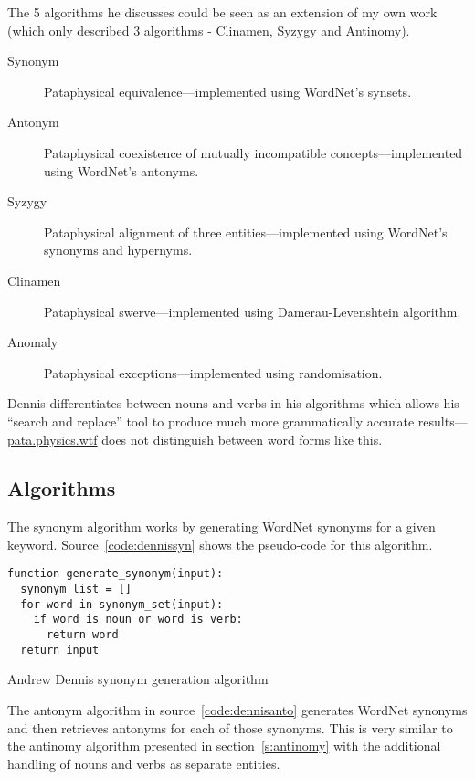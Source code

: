 The 5 algorithms he discusses could be seen as an extension of my own work (which only described 3 algorithms - Clinamen, Syzygy and Antinomy). 

\begin{description}
  \item[Synonym] Pataphysical equivalence---implemented using WordNet's synsets.
  \item[Antonym] Pataphysical coexistence of mutually incompatible concepts---implemented using WordNet's antonyms.
  \item[Syzygy] Pataphysical alignment of three entities---implemented using WordNet's synonyms and hypernyms.
  \item[Clinamen] Pataphysical swerve---implemented using Damerau-Levenshtein algorithm.
  \item[Anomaly] Pataphysical exceptions---implemented using randomisation.
\end{description}

Dennis differentiates between nouns and verbs in his algorithms which allows his ``search and replace'' tool to produce much more grammatically accurate results---\url{pata.physics.wtf} does not distinguish between word forms like this.


\subsection{Algorithms}

The synonym algorithm works by generating WordNet synonyms for a given keyword. Source~\ref{code:dennissyn} shows the pseudo-code for this algorithm.

\begin{listing}[!htbp] %
  \begin{verbatim}
function generate_synonym(input):
  synonym_list = []
  for word in synonym_set(input):
    if word is noun or word is verb:
      return word
  return input
  \end{verbatim}
\caption[Dennis synonym generation]{Andrew Dennis synonym generation algorithm}
\label{code:dennissyn}
\end{listing}

The antonym algorithm in source~\ref{code:dennisanto} generates WordNet synonyms and then retrieves antonyms for each of those synonyms. This is very similar to the antinomy algorithm presented in section~\ref{s:antinomy} with the additional handling of nouns and verbs as separate entities.

